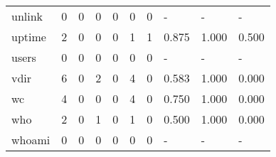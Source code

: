 \begin{longtable}{lp{1.3cm}p{1.3cm}p{1.3cm}p{1.3cm}p{1.3cm}p{1.3cm}p{1.3cm}p{1.3cm}p{1.3cm}}
unlink    &                      0 &                                             0 &                                            0 &                                           0 &                                            0 &                                          0 &                                    - &                                      - &                                    - \\
uptime    &                      2 &                                             0 &                                            0 &                                           0 &                                            1 &                                          1 &                                0.875 &                                  1.000 &                                0.500 \\
users     &                      0 &                                             0 &                                            0 &                                           0 &                                            0 &                                          0 &                                    - &                                      - &                                    - \\
vdir      &                      6 &                                             0 &                                            2 &                                           0 &                                            4 &                                          0 &                                0.583 &                                  1.000 &                                0.000 \\
wc        &                      4 &                                             0 &                                            0 &                                           0 &                                            4 &                                          0 &                                0.750 &                                  1.000 &                                0.000 \\
who       &                      2 &                                             0 &                                            1 &                                           0 &                                            1 &                                          0 &                                0.500 &                                  1.000 &                                0.000 \\
whoami    &                      0 &                                             0 &                                            0 &                                           0 &                                            0 &                                          0 &                                    - &                                      - &                                    - \\

\end{longtable}

